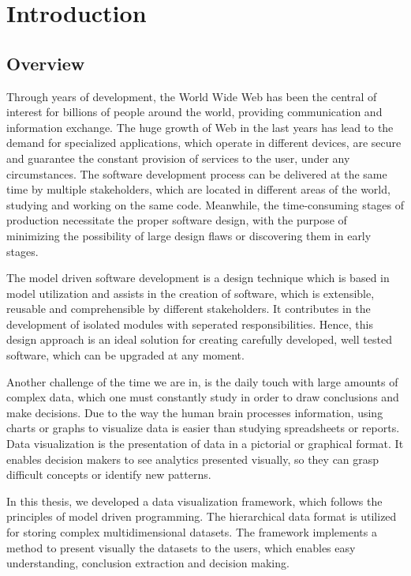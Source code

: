 
\chapter{Introduction} %

\section{Overview}
Through years of development, the World Wide Web has been the central of interest for billions of people around the world, providing communication and information exchange. The huge growth of Web in the last years has lead to the demand for specialized applications, which operate in different devices, are secure and guarantee the constant provision of services to the user, under any circumstances. The software development process can be delivered at the same time by multiple stakeholders, which are located in different areas of the world, studying and working on the same code. Meanwhile, the time-consuming stages of production necessitate the proper software design, with the purpose of minimizing the possibility of large design flaws or discovering them in early stages. \par 
	The model driven software development is a design technique which is based in model utilization and assists in the creation of software, which is extensible, reusable and comprehensible by different stakeholders. It contributes in the development of isolated modules with seperated responsibilities. Hence, this design approach is an ideal solution for creating carefully developed, well tested software, which can be upgraded at any moment. \par 
	Another challenge of the time we are in, is the daily touch with large amounts of complex data, which one must constantly study in order to draw conclusions and make decisions. Due to the way the human brain processes information, using charts or graphs to visualize data is easier than studying spreadsheets or reports. Data visualization is the presentation of data in a pictorial or graphical format. It enables decision makers to see analytics presented visually, so they can grasp difficult concepts or identify new patterns. \par
	In this thesis, we developed a data visualization framework, which follows the principles of model driven programming. The hierarchical data format is utilized for storing complex multidimensional datasets. The framework implements a method to present visually the datasets to the users, which enables easy understanding, conclusion extraction and decision making. \par 
